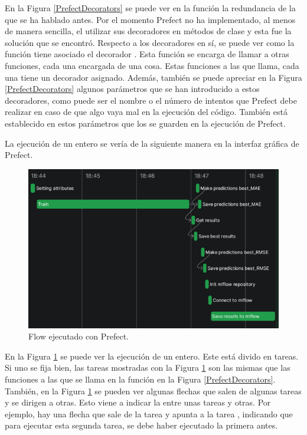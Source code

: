 En la Figura \ref{PrefectDecorators} se puede ver en la función  la redundancia de la que se ha hablado antes. Por el momento Prefect no ha implementado, al menos de manera sencilla, el utilizar sus decoradores en métodos de clase y esta fue la solución que se encontró. Respecto a los decoradores en sí, se puede ver como la función  tiene asociado el decorador . Esta función se encarga de llamar a otras funciones, cada una encargada de una cosa. Estas funciones a las que llama, cada una tiene un decorador  asignado. Además, también se puede apreciar en la Figura \ref{PrefectDecorators} algunos parámetros que se han introducido a estos decoradores, como puede ser el nombre o el número de intentos que Prefect debe realizar en caso de que algo vaya mal en la ejecución del código. También está establecido en estos parámetros que los  se guarden en la ejecución de Prefect.

La ejecución de un  entero se vería de la siguiente manera en la interfaz gráfica de Prefect.


\begin{figure}[H]
	\centering
	\includegraphics[scale = 0.7]{imgs/prefectUI.png}
	\caption{Flow ejecutado con Prefect.}
	\label{PrefectUI}
\end{figure}

En la Figura \ref{PrefectUI} se puede ver la ejecución de un  entero. Este  está divido en tareas. Si uno se fija bien, las tareas mostradas con la Figura \ref{PrefectUI} son las mismas que las funciones a las que se llama en la función  en la Figura \ref{PrefectDecorators}. También, en la Figura \ref{PrefectUI} se pueden ver algunas flechas que salen de algunas tareas y se dirigen a otras. Esto viene a indicar la  entre unas tareas y otras. Por ejemplo, hay una flecha que sale de la tarea  y apunta a la tarea , indicando que para ejecutar esta segunda tarea, se debe haber ejecutado la primera antes.

